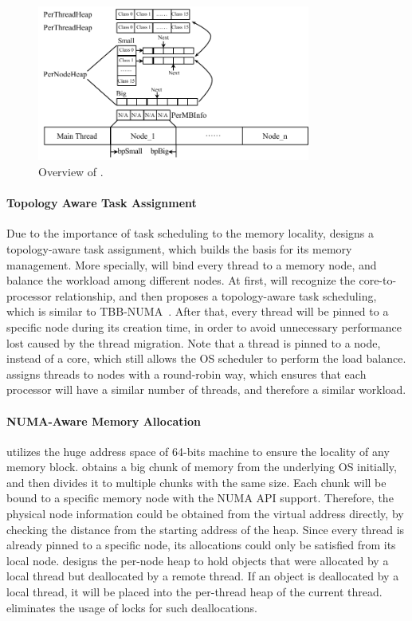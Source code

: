 \begin{figure}[h]
\begin{center}
\includegraphics[width=0.8\textwidth]{figure/heaplayout}
\end{center}
\vspace{-0.1in}
\caption{Overview of \NA{}.
\label{fig:overview}}
\vspace{-0.1in}
\end{figure}

\paragraph{Topology Aware Task Assignment} Due to the importance of task scheduling to the memory locality, \NA{} designs a topology-aware task assignment, which builds the basis for its memory management. More specially, \NA{} will bind every thread to a  memory node, and balance the workload among different nodes. At first, \NA{} will recognize the core-to-processor relationship, and then proposes a topology-aware task scheduling, which is similar to TBB-NUMA~\cite{Majo:2015:LPC:2688500.2688509}.  After that, every thread will be pinned to a specific node during its creation time, in order to avoid unnecessary performance lost caused by the thread migration. Note that a thread is pinned to a node, instead of a core, which still allows the OS scheduler to perform the load balance. \NA{} assigns threads to nodes with  a round-robin way, which ensures that each processor will have a similar number of threads, and therefore a similar workload.

\paragraph{NUMA-Aware Memory Allocation} \NA{} utilizes the huge address space of 64-bits machine to ensure the locality of any memory block. \NA{} obtains a big chunk of memory from the underlying OS initially, and then divides it to multiple chunks with the same size. Each chunk will be bound to a specific memory node with the NUMA API support. Therefore, the physical node information could be obtained from the virtual address directly, by checking the distance from the starting address of the heap. Since every thread is already pinned to a specific node, its allocations could only be satisfied from  its local node. \NA{} designs the per-node heap to hold objects that were allocated by a local thread but deallocated by a remote thread. If an object is deallocated by a local thread, it will be placed into the per-thread heap of the current thread. \NA{} eliminates the usage of locks for such deallocations.      

